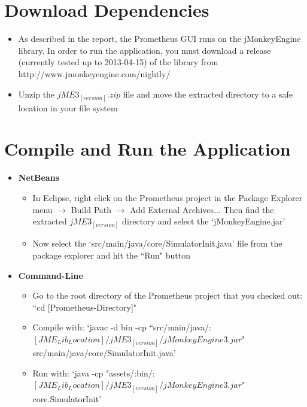 \documentclass[12pt]{article}
\begin{document}
\section{Download Dependencies}
\begin{itemize}
\item As described in the report, the Prometheus GUI runs on the jMonkeyEngine library. In order to run the application, you must download a release (currently tested up to 2013-04-15) of the library from http://www.jmonkeyengine.com/nightly/
\item Unzip the $jME3_[version].zip$ file and move the extracted directory to a safe location in your file system
\end{itemize}

\section{Compile and Run the Application}
\begin{itemize}
\item {\bf NetBeans}
	\begin{itemize}
	\item In Eclipse, right click on the Prometheus project in the Package Explorer menu $\rightarrow$  Build Path $\rightarrow$ Add External Archives... Then find the extracted $jME3_[version]$ directory and select the ‘jMonkeyEngine.jar’
	\item Now select the ‘src/main/java/core/SimulatorInit.java’ file from the package explorer and hit the ``Run" button
	\end{itemize}
\item {\bf Command-Line}
	\begin{itemize}
	\item Go to the root directory of the Prometheus project that you checked out: ``cd [Prometheus-Directory]"
	\item Compile with: ‘javac -d bin -cp ``src/main/java/:$[JME_Lib_Location]/jME3_[version]/jMonkeyEngine3.jar$" src/main/java/core/SimulatorInit.java’
	\item Run with: ‘java -cp "assets/:bin/:$[JME_Lib_Location]/jME3_[version]/jMonkeyEngine3.jar$" core.SimulatorInit’
	\end{itemize}
\end{itemize}
\end{document}
